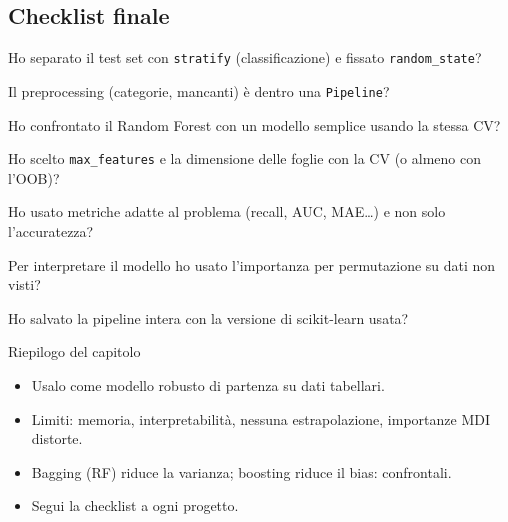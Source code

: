 \subsection{Checklist finale}

\begin{passi}
  \item Ho separato il test set con \texttt{stratify} (classificazione) e fissato \texttt{random\_state}?
  \item Il preprocessing (categorie, mancanti) è dentro una \texttt{Pipeline}?
  \item Ho confrontato il Random Forest con un modello semplice usando la stessa CV?
  \item Ho scelto \texttt{max\_features} e la dimensione delle foglie con la CV (o almeno con l'OOB)?
  \item Ho usato metriche adatte al problema (recall, AUC, MAE\dots) e non solo l'accuratezza?
  \item Per interpretare il modello ho usato l'importanza per permutazione su dati non visti?
  \item Ho salvato la pipeline intera con la versione di scikit-learn usata?
\end{passi}

\begin{appunti}{Riepilogo del capitolo}
\begin{itemize}
  \item Usalo come modello robusto di partenza su dati tabellari.
  \item Limiti: memoria, interpretabilità, nessuna estrapolazione, importanze MDI distorte.
  \item Bagging (RF) riduce la varianza; boosting riduce il bias: confrontali.
  \item Segui la checklist a ogni progetto.
\end{itemize}
\end{appunti}

